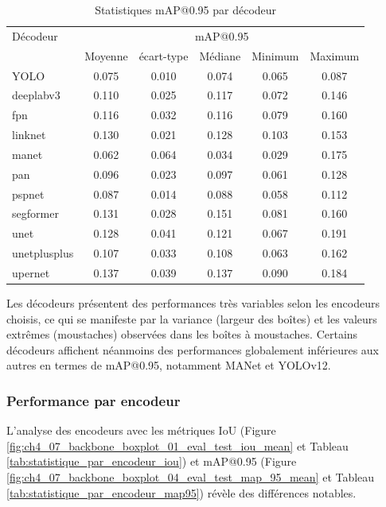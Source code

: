 \begin{table}[H]
    \centering
    \begin{tabular}{lccccc}
    \toprule
    Décodeur & \multicolumn{5}{c}{mAP@0.95} \\
    & Moyenne & écart-type & Médiane & Minimum & Maximum \\
    \midrule
    YOLO & 0.075 & 0.010 & 0.074 & 0.065 & 0.087 \\
    deeplabv3 & 0.110 & 0.025 & 0.117 & 0.072 & 0.146 \\
    fpn & 0.116 & 0.032 & 0.116 & 0.079 & 0.160 \\
    linknet & 0.130 & 0.021 & 0.128 & 0.103 & 0.153 \\
    manet & 0.062 & 0.064 & 0.034 & 0.029 & 0.175 \\
    pan & 0.096 & 0.023 & 0.097 & 0.061 & 0.128 \\
    pspnet & 0.087 & 0.014 & 0.088 & 0.058 & 0.112 \\
    segformer & 0.131 & 0.028 & 0.151 & 0.081 & 0.160 \\
    unet & 0.128 & 0.041 & 0.121 & 0.067 & 0.191 \\
    unetplusplus & 0.107 & 0.033 & 0.108 & 0.063 & 0.162 \\
    upernet & 0.137 & 0.039 & 0.137 & 0.090 & 0.184 \\
    \bottomrule
    \end{tabular}
    \caption{Statistiques mAP@0.95 par décodeur}
    \label{tab:statistique_par_decodeur_map95}
\end{table}

Les décodeurs présentent des performances très variables selon les encodeurs choisis, ce qui se manifeste par la variance (largeur des boîtes) et les valeurs extrêmes (moustaches) observées dans les boîtes à moustaches. Certains décodeurs affichent néanmoins des performances globalement inférieures aux autres en termes de mAP@0.95, notamment MANet et YOLOv12.

\subsubsection{Performance par encodeur}

L'analyse des encodeurs avec les métriques IoU (Figure \ref{fig:ch4_07_backbone_boxplot_01_eval_test_iou_mean} et Tableau \ref{tab:statistique_par_encodeur_iou}) et mAP@0.95 (Figure \ref{fig:ch4_07_backbone_boxplot_04_eval_test_map_95_mean} et Tableau \ref{tab:statistique_par_encodeur_map95}) révèle des différences notables.

